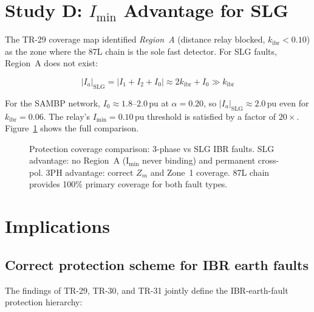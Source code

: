 \documentclass[11pt,a4paper]{article}
\begin{document}
\section{Study D: $I_\mathrm{min}$ Advantage for SLG}
\label{sec:study_d}

The TR-29 coverage map identified \emph{Region~A} (distance relay blocked,
$k_\mathrm{ibr}<0.10$) as the zone where the 87L chain is the sole fast detector.
For SLG faults, Region~A does not exist:

\begin{equation}
  |I_a|_\mathrm{SLG} = |I_1 + I_2 + I_0| \approx 2k_\mathrm{ibr} + I_0
  \gg k_\mathrm{ibr}
\end{equation}

For the SAMBP network, $I_0 \approx 1.8$--$2.0$\,pu at $\alpha=0.20$, so
$|I_a|_\mathrm{SLG} \approx 2.0$\,pu even for $k_\mathrm{ibr}=0.06$.  The relay's
$I_\mathrm{min}=0.10$\,pu threshold is satisfied by a factor of $20\times$.
Figure~\ref{fig:coverage} shows the full comparison.

\begin{figure}[h!]
\centering
\caption{%
  Protection coverage comparison: 3-phase vs SLG IBR faults.
  SLG advantage: no Region~A (I$_\mathrm{min}$ never binding) and permanent
  cross-pol.  3PH advantage: correct $Z_m$ and Zone~1 coverage.
  87L chain provides 100\% primary coverage for both fault types.}
\label{fig:coverage}

\end{figure}

\section{Implications}
\label{sec:implications}

\subsection{Correct protection scheme for IBR earth faults}

The findings of TR-29, TR-30, and TR-31 jointly define the IBR-earth-fault
protection hierarchy:
\end{document}
